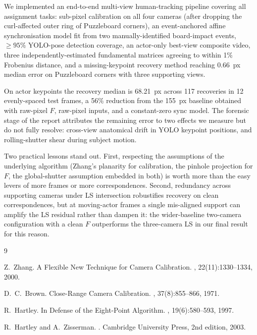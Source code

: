\documentclass[twocolumn]{article}
\begin{document}
We implemented an end-to-end multi-view human-tracking pipeline
covering all assignment tasks: sub-pixel calibration on all four
cameras (after dropping the curl-affected outer ring of Puzzleboard
corners), an event-anchored affine synchronisation model fit from
two manually-identified board-impact events,
$\geq 95\%$ YOLO-pose detection coverage, an actor-only best-view
composite video, three independently-estimated fundamental matrices
agreeing to within 1\% Frobenius distance, and a missing-keypoint
recovery method reaching 0.66~px median error on Puzzleboard corners
with three supporting views.

On actor keypoints the recovery median is 68.21~px across 117
recoveries in 12 evenly-spaced test frames, a 56\% reduction from
the 155~px baseline obtained with raw-pixel $F$, raw-pixel inputs,
and a constant-zero sync model. The forensic stage of the report
attributes the remaining error to two effects we measure but do not
fully resolve: cross-view anatomical drift in YOLO keypoint
positions, and rolling-shutter shear during subject motion.

Two practical lessons stand out. First, respecting the assumptions
of the underlying algorithm (Zhang's planarity for calibration, the
pinhole projection for $F$, the global-shutter assumption embedded
in both) is worth more than the easy levers of more frames or more
correspondences. Second, redundancy across supporting cameras under
LS intersection robustifies recovery on clean correspondences, but
at moving-actor frames a single mis-aligned support can amplify the
LS residual rather than dampen it: the wider-baseline two-camera
configuration with a clean $F$ outperforms the three-camera LS in
our final result for this reason.

\begin{thebibliography}{9}

Z.~Zhang.
\newblock A Flexible New Technique for Camera Calibration.
, 22(11):1330--1334, 2000.

D.~C.~Brown.
\newblock Close-Range Camera Calibration.
, 37(8):855--866, 1971.

R.~Hartley.
\newblock In Defense of the Eight-Point Algorithm.
, 19(6):580--593, 1997.

R.~Hartley and A.~Zisserman.
.
\newblock Cambridge University Press, 2nd edition, 2003.

\end{thebibliography}
\end{document}
